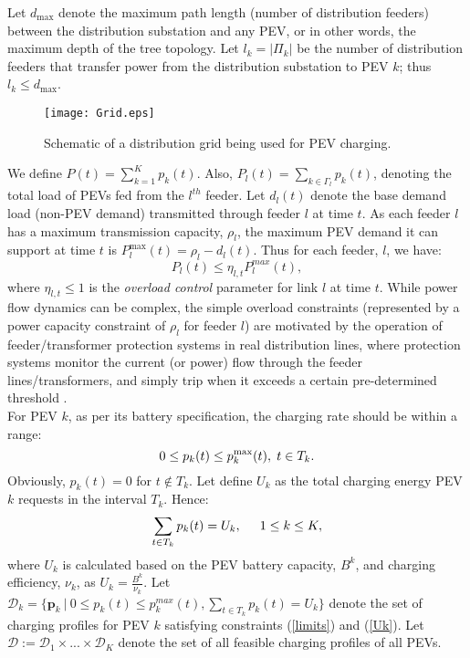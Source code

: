 \documentclass[12pt,draftcls,onecolumn]{IEEEtran}
\begin{document}
Let $d_{\max}$ denote the maximum path length (number of distribution feeders) between the distribution substation and any PEV, or in other words, the maximum depth of the tree topology. Let $l_k=|\Pi_k|$ be the number of distribution feeders that transfer power from the distribution substation to PEV $k$; thus $l_k \leq d_{\max}$.\\
\begin{figure}
\centering
\texttt{[image: Grid.eps]}
\caption{Schematic of a distribution grid being used for PEV charging.}
\label{Topology}
\end{figure}
\indent We define $P(t)=\sum_{k=1}^{K}p_k(t)$. Also, $P_l(t)=\sum_{k \in \Gamma_l}p_k(t)$, denoting the total load of PEVs fed from the $l^{th}$ feeder. Let $d_l(t)$ denote the base demand load (non-PEV demand) transmitted through feeder $l$ at time $t$. As each feeder $l$ has a maximum transmission capacity, $\rho_l$, the maximum PEV demand it can support at time $t$ is $P_l^{\max}(t)=\rho_l-d_l(t)$. Thus for each feeder, $l$, we have:
\begin{equation}
P_l(t) \leq \eta_{l,t} P_l^{max}(t),
\label{congestion1}
\end{equation}
where $\eta_{l,t} \leq 1$ is the \textit{overload control} parameter for link $l$ at time $t$. While power flow dynamics can be complex, the simple overload constraints (represented by a power capacity constraint of $\rho_l$ for feeder $l$) are motivated by the operation of feeder/transformer protection systems in real distribution lines, where protection systems monitor the current (or power) flow through the feeder lines/transformers, and simply trip when it exceeds a certain pre-determined threshold \cite{GE79}.\\
\indent For PEV $k$, as per its battery specification, the charging rate should be within a range:
\begin{equation}
0 \leq p_k(t) \leq p_k^{\max}(t), \hspace{1mm} t \in T_k.
\label{limits}
\end{equation}
Obviously, $p_k(t) = 0$ for $t \notin T_k$. Let define $U_k$ as the total charging energy PEV $k$ requests in the interval $T_k$. Hence:
\begin{equation}
\sum_{t\in T_k} p_k(t) = U_k, \hspace{5mm} 1 \leq k \leq K,
\label{Uk}
\end{equation}
where $U_k$ is calculated based on the PEV battery capacity, $B^k$, and charging efficiency, $\nu_k$, as $U_k=\frac{B^k}{\nu_k}$. Let $\mathcal{D}_k=\{\mathbf{p}_k \ | \ 0 \leq p_k(t) \leq p_k^{max}(t), \sum_{t\in T_k}p_k(t)=U_k\}$ denote the set of charging profiles for PEV $k$ satisfying constraints (\ref{limits}) and (\ref{Uk}). Let $\mathcal{D} := \mathcal{D}_1 \times ... \times \mathcal{D}_K$ denote the set of all feasible charging profiles of all PEVs.\\
\end{document}
